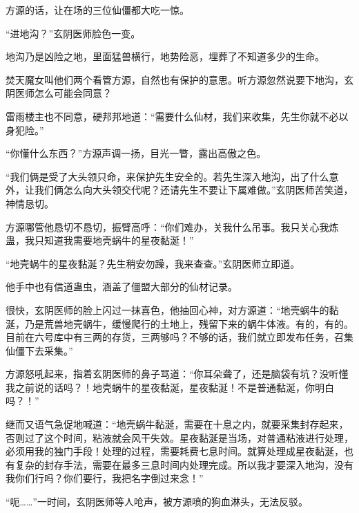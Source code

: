 \begin{this_body}
方源的话，让在场的三位仙僵都大吃一惊。

“进地沟？”玄阴医师脸色一变。

地沟乃是凶险之地，里面猛兽横行，地势险恶，埋葬了不知道多少的生命。

焚天魔女叫他们两个看管方源，自然也有保护的意思。听方源忽然说要下地沟，玄阴医师怎么可能会同意？

雷雨楼主也不同意，硬邦邦地道：“需要什么仙材，我们来收集，先生你就不必以身犯险。”

“你懂什么东西？”方源声调一扬，目光一瞥，露出高傲之色。

“我们俩是受了大头领只命，来保护先生安全的。若先生深入地沟，出了什么意外，让我们俩怎么向大头领交代呢？还请先生不要让下属难做。”玄阴医师苦笑道，神情恳切。

方源哪管他恳切不恳切，振臂高呼：“你们难办，关我什么吊事。我只关心我炼蛊，我只知道我需要地壳蜗牛的星夜黏涎！”

“地壳蜗牛的星夜黏涎？先生稍安勿躁，我来查查。”玄阴医师立即道。

他手中也有信道蛊虫，涵盖了僵盟大部分的仙材记录。

很快，玄阴医师的脸上闪过一抹喜色，他抽回心神，对方源道：“地壳蜗牛的黏涎，乃是荒兽地壳蜗牛，缓慢爬行的土地上，残留下来的蜗牛体液。有的，有的。目前在六号库中有三两的存货，三两够吗？不够的话，我们就立即发布任务，召集仙僵下去采集。”

方源怒吼起来，指着玄阴医师的鼻子骂道：“你耳朵聋了，还是脑袋有坑？没听懂我之前说的话吗？！地壳蜗牛的星夜黏涎，星夜黏涎！不是普通黏涎，你明白吗？！”

继而又语气急促地喊道：“地壳蜗牛黏涎，需要在十息之内，就要采集封存起来，否则过了这个时间，粘液就会风干失效。星夜黏涎是当场，对普通粘液进行处理，必须用我的独门手段！处理的过程，需要耗费七息时间。就算处理成星夜黏涎，也有复杂的封存手法，需要在最多三息时间内处理完成。所以我才要深入地沟，没有我你们行吗？你们要行，我把名字倒过来念！”

“呃……”一时间，玄阴医师等人呛声，被方源喷的狗血淋头，无法反驳。

\end{this_body}

